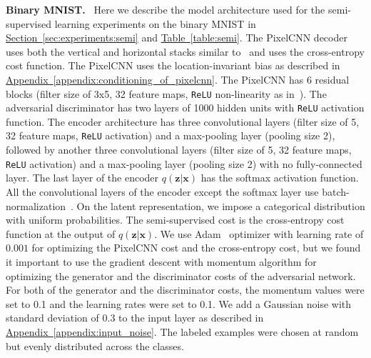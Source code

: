 \documentclass{article}
\newcommand{\mysec}[1]{\hyperref[sec:#1]{Section~\ref*{sec:#1}}}
\newcommand{\mytable}[1]{\hyperref[table:#1]{Table~\ref*{table:#1}}}
\newcommand{\myappendix}[1]{\hyperref[appendix:#1]{Appendix~\ref*{appendix:#1}}}
\DeclareRobustCommand{\parhead}[1]{\textbf{#1}~}
\begin{document}
\begin{appendices}
\parhead{Binary MNIST.} Here we describe the model architecture used for the semi-supervised learning experiments on the binary MNIST in \mysec{experiments:semi} and \mytable{semi}. 
The PixelCNN decoder uses both the vertical and horizontal stacks similar to~\citep{pixelcnn} and uses the cross-entropy cost function.
The PixelCNN uses the location-invariant bias as described in \myappendix{conditioning_of_pixelcnn}.
The PixelCNN has 6 residual blocks (filter size of 3x5, 32 feature maps, \texttt{ReLU} non-linearity as in~\citep{pixelcnn}). 
The adversarial discriminator has two layers of 1000 hidden units with \texttt{ReLU} activation function. 
The encoder architecture has three convolutional layers (filter size of 5, 32 feature maps, \texttt{ReLU} activation) and a max-pooling layer (pooling size 2), followed by another three convolutional layers (filter size of 5, 32 feature maps, \texttt{ReLU} activation) and a max-pooling layer (pooling size 2) with no fully-connected layer.
The last layer of the encoder $q(\mathbf{z}|\mathbf{x})$ has the softmax activation function. All the convolutional layers of the encoder except the softmax layer use batch-normalization~\citep{batch}. 
On the latent representation, we impose a categorical distribution with uniform probabilities. 
The semi-supervised cost is the cross-entropy cost function at the output of $q(\mathbf{z}|\mathbf{x})$. We use Adam~\citep{Adam} optimizer with learning rate of $0.001$ for optimizing the PixelCNN cost and the cross-entropy cost, but we found it important to use the gradient descent with momentum algorithm for optimizing the generator and the discriminator costs of the adversarial network. 
For both of the generator and the discriminator costs, the momentum values were set to 0.1 and the learning rates were set to 0.1. 
We add a Gaussian noise with standard deviation of $0.3$ to the input layer as described in \myappendix{input_noise}. 
The labeled examples were chosen at random but evenly distributed across the classes.


\end{appendices}
\end{document}
